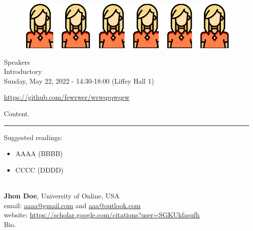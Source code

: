 \begin{center}
    \vspace{-0.5cm}
        \begin{figure}[h!]
      \includegraphics[width=\linewidth]{examples/handbook_coling25/tutorials/images/t1.png}
    \end{figure}
    \normalsize{Speakers}\\
    \large{Introductory}\\
    \large{Sunday, May 22, 2022 - 14:30-18:00 (Liffey Hall 1)}\\
    \par\bigskip
    \normalsize{\url{https://github.com/fewrwer/wrwqrqwqrw}}

\end{center}

Content.

\begin{center}
    \noindent\rule{200px}{1pt}
\end{center}

Suggested readings:
\begin{itemize}
    \item AAAA (BBBB)
    \item CCCC (DDDD)
\end{itemize}



\noindent
\\
\textbf{Jhon Doe}, University of Online, USA\\
\noindent
email: \url{aaaa@gmail.com} and \url{aaa@outlook.com}\\
website: \url{https://scholar.google.com/citations?user=SGKUkfasufh}\\
Bio.